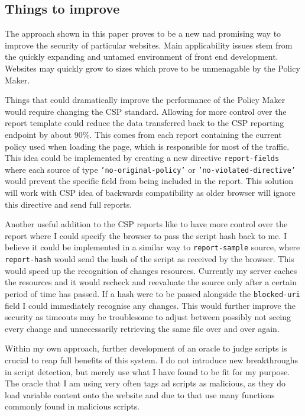 \begin{description}
\section{Things to improve}

The approach shown in this paper proves to be a new nad promising way to improve the security of particular websites.
Main applicability issues stem from the quickly expanding and untamed environment of front end development.
Websites may quickly grow to sizes which prove to be unmenagable by the Policy Maker.

Things that could dramatically improve the performance of the Policy Maker would require changing the CSP standard.
Allowing for more control over the report template could reduce the data transferred back to the CSP reporting endpoint by about 90\%.
This comes from each report containing the current policy used when loading the page, which is responsible for most of the traffic.
This idea could be implemented by creating a new directive \texttt{report-fields} where each source of type \texttt{'no-original-policy'} or \texttt{'no-violated-directive'} would prevent the specific field from being included in the report.
This solution will work with CSP idea of backwards compatibility as older browser will ignore this directive and send full reports.

Another useful addition to the CSP reports like to have more control over the report where I could specify the browser to pass the script hash back to me.
I believe it could be implemented in a similar way to \texttt{report-sample} source, where \texttt{report-hash} would send the hash of the script as received by the browser.
This would speed up the recognition of changes resources. 
Currently my server caches the resources and it would recheck and reevaluate the source only after a certain period of time has passed.
If a hash were to be passed alongside the \texttt{blocked-uri} field I could immediately recognise any changes.
This would further improve the security as timeouts may be troublesome to adjust between possibly not seeing every change and unnecessarily retrieving the same file over and over again.

Within my own approach, further development of an oracle to judge scripts is crucial to reap full benefits of this system.
I do not introduce new breakthroughs in script detection, but merely use what I have found to be fit for my purpose.
The oracle that I am using very often tags ad scripts as malicious, as they do load variable content onto the website and due to that use many functions commonly found in malicious scripts.


\end{description}
